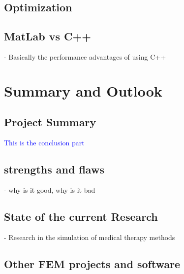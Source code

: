 \documentclass[parskip=half, titlepage=yes, 12pt, BCOR=12mm, DIV=calc]{scrartcl}
\begin{document}
\subsection{Optimization}

\subsection{MatLab vs C++}

- Basically the performance advantages of using C++


\section{Summary and Outlook}

\subsection{Project Summary}

\textcolor{blue}
{
This is the conclusion part
}

\subsection{strengths and flaws}
- why is it good, why is it bad

\subsection{State of the current Research}
- Research in the simulation of medical therapy methods \\

\subsection{Other FEM projects and software}


\newpage


\clearpage
\nocite{*}
\printbibliography

\newpage

\appendix

 
\end{document}
